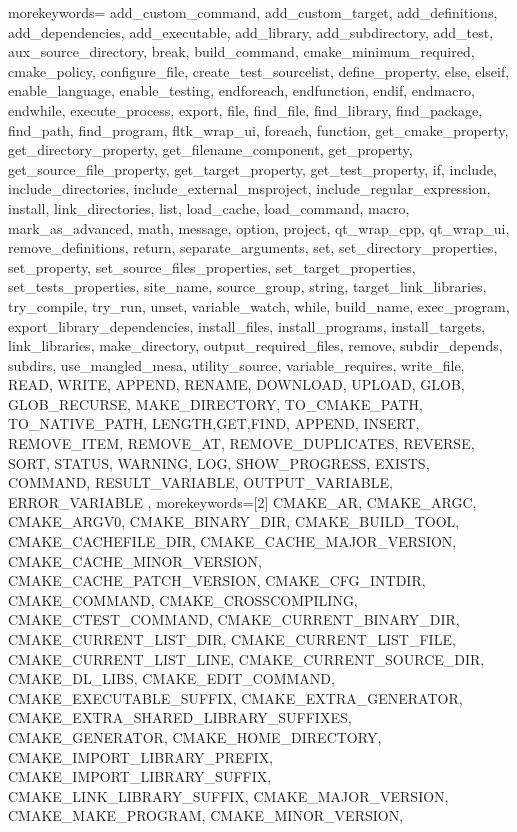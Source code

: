 	{
         morekeywords={
add_custom_command,
add_custom_target,
add_definitions,
add_dependencies,
add_executable,
add_library,
add_subdirectory,
add_test,
aux_source_directory,
break,
build_command,
cmake_minimum_required,
cmake_policy,
configure_file,
create_test_sourcelist,
define_property,
else,
elseif,
enable_language,
enable_testing,
endforeach,
endfunction,
endif,
endmacro,
endwhile,
execute_process,
export,
file,
find_file,
find_library,
find_package,
find_path,
find_program,
fltk_wrap_ui,
foreach,
function,
get_cmake_property,
get_directory_property,
get_filename_component,
get_property,
get_source_file_property,
get_target_property,
get_test_property,
if,
include,
include_directories,
include_external_msproject,
include_regular_expression,
install,
link_directories,
list,
load_cache,
load_command,
macro,
mark_as_advanced,
math,
message,
option,
project,
qt_wrap_cpp,
qt_wrap_ui,
remove_definitions,
return,
separate_arguments,
set,
set_directory_properties,
set_property,
set_source_files_properties,
set_target_properties,
set_tests_properties,
site_name,
source_group,
string,
target_link_libraries,
try_compile,
try_run,
unset,
variable_watch,
while,
build_name,
exec_program,
export_library_dependencies,
install_files,
install_programs,
install_targets,
link_libraries,
make_directory,
output_required_files,
remove,
subdir_depends,
subdirs,
use_mangled_mesa,
utility_source,
variable_requires,
write_file,
READ, WRITE, APPEND, RENAME, DOWNLOAD, UPLOAD,
GLOB, GLOB_RECURSE, MAKE_DIRECTORY,
TO_CMAKE_PATH, TO_NATIVE_PATH,
LENGTH,GET,FIND, APPEND, INSERT, REMOVE_ITEM, REMOVE_AT, REMOVE_DUPLICATES, REVERSE, SORT,
STATUS, WARNING, LOG, SHOW_PROGRESS, EXISTS, COMMAND,
RESULT_VARIABLE, OUTPUT_VARIABLE, ERROR_VARIABLE
         },
         morekeywords=[2]{
CMAKE_AR,
CMAKE_ARGC,
CMAKE_ARGV0,
CMAKE_BINARY_DIR,
CMAKE_BUILD_TOOL,
CMAKE_CACHEFILE_DIR,
CMAKE_CACHE_MAJOR_VERSION,
CMAKE_CACHE_MINOR_VERSION,
CMAKE_CACHE_PATCH_VERSION,
CMAKE_CFG_INTDIR,
CMAKE_COMMAND,
CMAKE_CROSSCOMPILING,
CMAKE_CTEST_COMMAND,
CMAKE_CURRENT_BINARY_DIR,
CMAKE_CURRENT_LIST_DIR,
CMAKE_CURRENT_LIST_FILE,
CMAKE_CURRENT_LIST_LINE,
CMAKE_CURRENT_SOURCE_DIR,
CMAKE_DL_LIBS,
CMAKE_EDIT_COMMAND,
CMAKE_EXECUTABLE_SUFFIX,
CMAKE_EXTRA_GENERATOR,
CMAKE_EXTRA_SHARED_LIBRARY_SUFFIXES,
CMAKE_GENERATOR,
CMAKE_HOME_DIRECTORY,
CMAKE_IMPORT_LIBRARY_PREFIX,
CMAKE_IMPORT_LIBRARY_SUFFIX,
CMAKE_LINK_LIBRARY_SUFFIX,
CMAKE_MAJOR_VERSION,
CMAKE_MAKE_PROGRAM,
CMAKE_MINOR_VERSION,
}}
